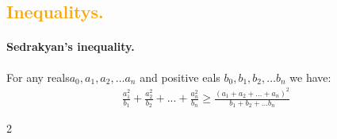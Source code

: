 \documentclass{article}
\begin{document}
\begin{multicols*}{2}
  \subsection*{{\textcolor{orange}{Inequalitys.}} } 
  \paragraph{Sedrakyan's inequality.} For any reals$a_{0},a_{1},a_{2},\ldots a_{n}$ and positive eals $b_{0},b_{1},b_{2},\ldots b_{n}$ we have:  
  \begin{equation*}
    \begin{split}
      \frac{a_{1}^2}{b_{1}}+\frac{a_{2}^2}{b_{2}}+ ...+ \frac{a_{n}^2}{b_{n}} \ge \frac{\left( a_{1}+ a_{2} + ... + a_{n}  \right)^{2}}{b_{1}+b_{2}+... b_{n}}  
    \end{split}
  \end{equation*}
\end{multicols*}{2}
\end{document}

